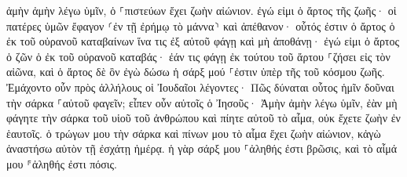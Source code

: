 \documentclass{openreader}
\begin{document}
ἀμὴν ἀμὴν λέγω ὑμῖν, ὁ ⸀πιστεύων ἔχει ζωὴν αἰώνιον. 
ἐγώ εἰμι ὁ ἄρτος τῆς ζωῆς· 
οἱ πατέρες ὑμῶν ἔφαγον ⸂ἐν τῇ ἐρήμῳ τὸ μάννα⸃ καὶ ἀπέθανον· 
οὗτός ἐστιν ὁ ἄρτος ὁ ἐκ τοῦ οὐρανοῦ καταβαίνων ἵνα τις ἐξ αὐτοῦ φάγῃ καὶ μὴ ἀποθάνῃ· 
ἐγώ εἰμι ὁ ἄρτος ὁ ζῶν ὁ ἐκ τοῦ οὐρανοῦ καταβάς· ἐάν τις φάγῃ ἐκ τούτου τοῦ ἄρτου ⸀ζήσει εἰς τὸν αἰῶνα, καὶ ὁ ἄρτος δὲ ὃν ἐγὼ δώσω ἡ σάρξ μού ⸀ἐστιν ὑπὲρ τῆς τοῦ κόσμου ζωῆς. 
Ἐμάχοντο οὖν πρὸς ἀλλήλους οἱ Ἰουδαῖοι λέγοντες· Πῶς δύναται οὗτος ἡμῖν δοῦναι τὴν σάρκα ⸀αὐτοῦ φαγεῖν; 
εἶπεν οὖν αὐτοῖς ὁ Ἰησοῦς· Ἀμὴν ἀμὴν λέγω ὑμῖν, ἐὰν μὴ φάγητε τὴν σάρκα τοῦ υἱοῦ τοῦ ἀνθρώπου καὶ πίητε αὐτοῦ τὸ αἷμα, οὐκ ἔχετε ζωὴν ἐν ἑαυτοῖς. 
ὁ τρώγων μου τὴν σάρκα καὶ πίνων μου τὸ αἷμα ἔχει ζωὴν αἰώνιον, κἀγὼ ἀναστήσω αὐτὸν τῇ ἐσχάτῃ ἡμέρᾳ. 
ἡ γὰρ σάρξ μου ⸀ἀληθής ἐστι βρῶσις, καὶ τὸ αἷμά μου ⸁ἀληθής ἐστι πόσις. 
\end{document}
